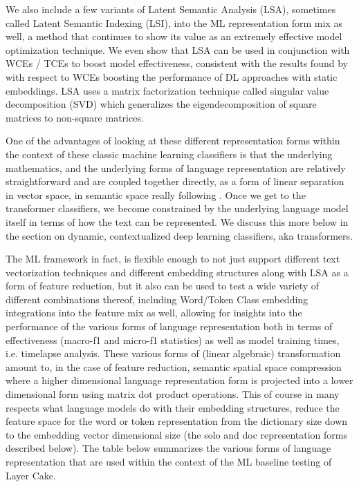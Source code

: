 \documentclass[final]{clv2025}
\begin{document}
We also include a few variants of Latent Semantic Analysis (LSA), sometimes called Latent Semantic Indexing (LSI), \cite{deerwester} into the ML representation form mix as well, a method that continues to show its value as an extremely effective model optimization technique. We even show that LSA can be used in conjunction with WCEs / TCEs to boost model effectiveness, consistent with the results found by \cite{moreo2021} with respect to WCEs boosting the performance of DL approaches with static embeddings. LSA uses a matrix factorization technique called singular value decomposition (SVD) which generalizes the eigendecomposition of square matrices to non-square matrices. 

One of the advantages of looking at these different representation forms within the context of these classic machine learning classifiers is that the underlying mathematics, and the underlying forms of language representation are relatively straightforward and are coupled together directly, as a form of linear separation in vector space, in semantic space really following \cite{worth}. Once we get to the transformer classifiers, we become constrained by the underlying language model itself in terms of how the text can be represented. We discuss this more below in the section on dynamic, contextualized deep learning classifiers, aka transformers.

The ML framework in fact, is flexible enough to not just support different text vectorization techniques and different embedding structures along with LSA as a form of feature reduction, but it also can be used to test a wide variety of different combinations thereof, including Word/Token Class embedding integrations into the feature mix as well, allowing for insights into the performance of the various forms of language representation both in terms of effectiveness (macro-f1 and micro-f1 statistics) as well as model training times, i.e. timelapse analysis. These various forms of (linear algebraic) transformation amount to, in the case of feature reduction, semantic spatial space compression where a higher dimensional language representation form is projected into a lower dimensional form using matrix dot product operations. This of course in many respects what language models do with their embedding structures, reduce the feature space for the word or token representation from the dictionary size down to the embedding vector dimensional size (the solo and doc representation forms described below). The table below summarizes the various forms of language representation that are used within the context of the ML baseline testing of Layer Cake.
\end{document}
